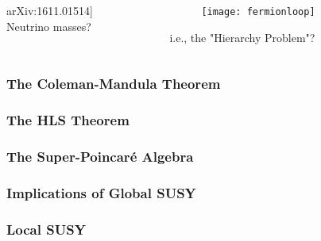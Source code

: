 \documentclass[10pt,aspectratio=169]{beamer}
\begin{document}
\begin{frame}
\begin{columns}[t]
\begin{column}{0.7\textwidth}
\begin{columns}[t]
\begin{column}{0.5\textwidth}
\begin{center}
{{              arXiv:1611.01514}]} \\
            Neutrino masses?
          \end{center}
        \end{column}
        \begin{column}{0.5\textwidth}
          \begin{figure}
            \texttt{[image: fermionloop]}
          \end{figure}
          \begin{center}
            \alert{i.e., the "Hierarchy Problem"?}
          \end{center}
        \end{column}
      \end{columns}
    \end{column}
    \end{columns}
\end{frame}

\begin{frame}
  \frametitle{The Coleman-Mandula Theorem}
\end{frame}

\begin{frame}
  \frametitle{The HLS Theorem}
\end{frame}

\begin{frame}
  \frametitle{The Super-Poincar\'{e} Algebra}
\end{frame}

\begin{frame}
  \frametitle{Implications of Global SUSY}
\end{frame}

\begin{frame}
  \frametitle{Local SUSY}
\end{frame}
\end{document}
